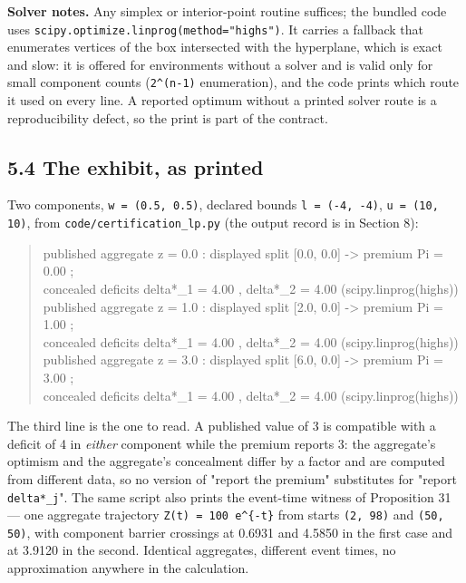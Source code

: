 \documentclass[11pt]{article}
\begin{document}
\textbf{Solver notes.} Any simplex or interior-point routine suffices; the bundled code uses \texttt{scipy.optimize.linprog(method="highs")}. It carries a fallback that enumerates vertices of the box intersected with the hyperplane, which is exact and slow: it is offered for environments without a solver and is valid only for small component counts (\texttt{2\textasciicircum{}(n-1)} enumeration), and the code prints which route it used on every line. A reported optimum without a printed solver route is a reproducibility defect, so the print is part of the contract.

\subsection*{5.4 The exhibit, as printed}\label{54-the-exhibit-as-printed}

Two components, \texttt{w = (0.5, 0.5)}, declared bounds \texttt{l = (-4, -4)}, \texttt{u = (10, 10)}, from \texttt{code/certification\_lp.py} (the output record is in Section 8):

\begin{quote}\ttfamily\footnotesize\raggedright\setlength{\parskip}{0pt}
published aggregate z =  0.0 :  displayed split [0.0, 0.0] -> premium Pi =  0.00 ;\\
                                 concealed deficits delta*\_1 = 4.00 , delta*\_2 = 4.00   (scipy.linprog(highs))\\
published aggregate z =  1.0 :  displayed split [2.0, 0.0] -> premium Pi =  1.00 ;\\
                                 concealed deficits delta*\_1 = 4.00 , delta*\_2 = 4.00   (scipy.linprog(highs))\\
published aggregate z =  3.0 :  displayed split [6.0, 0.0] -> premium Pi =  3.00 ;\\
                                 concealed deficits delta*\_1 = 4.00 , delta*\_2 = 4.00   (scipy.linprog(highs))
\end{quote}

The third line is the one to read. A published value of 3 is compatible with a deficit of 4 in \emph{either} component while the premium reports 3: the aggregate's optimism and the aggregate's concealment differ by a factor and are computed from different data, so no version of "report the premium" substitutes for "report \texttt{delta*\_j}". The same script also prints the event-time witness of Proposition 31 --- one aggregate trajectory \texttt{Z(t) = 100 e\textasciicircum{}\{-t\}} from starts \texttt{(2, 98)} and \texttt{(50, 50)}, with component barrier crossings at 0.6931 and 4.5850 in the first case and at 3.9120 in the second. Identical aggregates, different event times, no approximation anywhere in the calculation.
\end{document}
